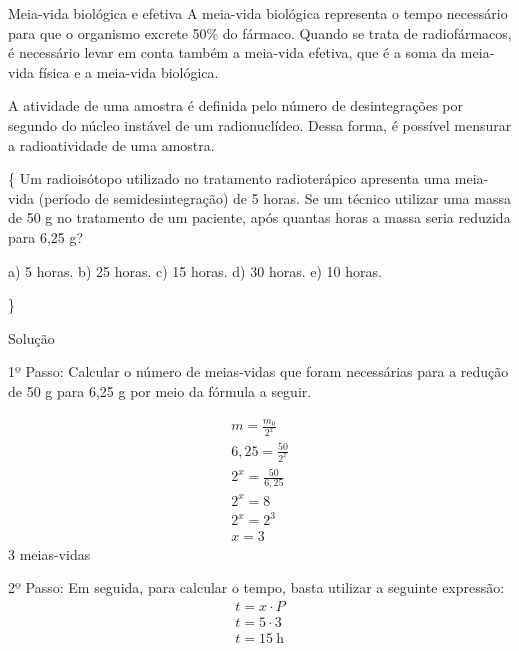 \documentclass[presentation,professionalfonts,aspectratio=169]{beamer}
\begin{document}
\begin{frame}[label={sec:orgbf1d788}]{Meia-vida biológica e efetiva}
A meia-vida biológica representa o tempo necessário para que o organismo excrete 50\% do fármaco. Quando se trata de radiofármacos, é necessário levar em conta também a meia-vida efetiva, que é a soma da meia-vida física e a meia-vida biológica.

A atividade de uma amostra é definida pelo número de desintegrações por segundo do núcleo instável de um radionuclídeo. Dessa forma, é possível mensurar a radioatividade de uma amostra. 
\end{frame}

\begin{frame}[label={sec:orgbc8d485}]{}
\vspace{-1cm}

\begin{question}
\small\{
Um radioisótopo utilizado no tratamento radioterápico apresenta uma meia-vida (período de semidesintegração) de 5 horas. Se um técnico utilizar uma massa de 50 g no tratamento de um paciente, após quantas horas a massa seria reduzida para 6,25 g?

a) 5 horas.  \quad b) 25 horas. \quad c) 15 horas. \quad d) 30 horas. \quad e) 10 horas.

\}
\begin{myrule}{Solução}
\begin{minipage}{0.5\textwidth}


\alert{1º Passo:} Calcular o número de meias-vidas que foram necessárias para a redução de 50 g para 6,25 g por meio da fórmula a seguir.

\begin{align*}
m=\frac{m_0}{2^x} \\
6,25 = \frac{50}{2^x}\\
2^x= \frac{50}{6,25}\\
2^x=8 \\
2^x = 2^3 \\
x= 3
\end{align*}
3 meias-vidas
\end{minipage}
\hspace{0.05\textwidth}
\begin{minipage}{0.4\textwidth}
\alert{2º Passo:} Em seguida, para calcular o tempo, basta utilizar a seguinte expressão:
\begin{align*}
t = x \cdot P \\
t = 5 \cdot 3 \\
t = 15 ~ \text{h}
\end{align*}
\end{minipage}
\end{myrule}
\end{question}
\end{frame}
\end{document}

